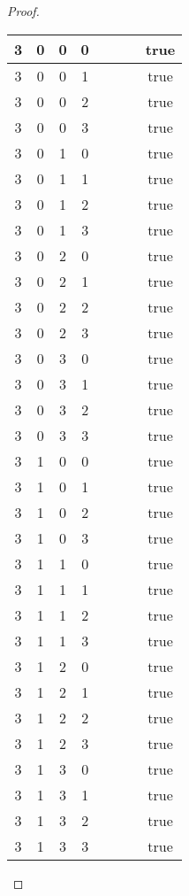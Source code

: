 \documentclass[10pt]{article}
\theoremstyle{definition}
\theoremstyle{plain}
\begin{document}
\begin{proof}
\begin{longtable}{|c|c|c|c|c|c|c|c|}
      3 & 0 & 0 & 0 &  &  &  & true \tabularnewline \hline
      3 & 0 & 0 & 1 &  &  &  & true \tabularnewline \hline
      3 & 0 & 0 & 2 &  &  &  & true \tabularnewline \hline
      3 & 0 & 0 & 3 &  &  &  & true \tabularnewline \hline
      3 & 0 & 1 & 0 &  &  &  & true \tabularnewline \hline
      3 & 0 & 1 & 1 &  &  &  & true \tabularnewline \hline
      3 & 0 & 1 & 2 &  &  &  & true \tabularnewline \hline
      3 & 0 & 1 & 3 &  &  &  & true \tabularnewline \hline
      3 & 0 & 2 & 0 &  &  &  & true \tabularnewline \hline
      3 & 0 & 2 & 1 &  &  &  & true \tabularnewline \hline
      3 & 0 & 2 & 2 &  &  &  & true \tabularnewline \hline
      3 & 0 & 2 & 3 &  &  &  & true \tabularnewline \hline
      3 & 0 & 3 & 0 &  &  &  & true \tabularnewline \hline
      3 & 0 & 3 & 1 &  &  &  & true \tabularnewline \hline
      3 & 0 & 3 & 2 &  &  &  & true \tabularnewline \hline
      3 & 0 & 3 & 3 &  &  &  & true \tabularnewline \hline
      3 & 1 & 0 & 0 &  &  &  & true \tabularnewline \hline
      3 & 1 & 0 & 1 &  &  &  & true \tabularnewline \hline
      3 & 1 & 0 & 2 &  &  &  & true \tabularnewline \hline
      3 & 1 & 0 & 3 &  &  &  & true \tabularnewline \hline
      3 & 1 & 1 & 0 &  &  &  & true \tabularnewline \hline
      3 & 1 & 1 & 1 &  &  &  & true \tabularnewline \hline
      3 & 1 & 1 & 2 &  &  &  & true \tabularnewline \hline
      3 & 1 & 1 & 3 &  &  &  & true \tabularnewline \hline
      3 & 1 & 2 & 0 &  &  &  & true \tabularnewline \hline
      3 & 1 & 2 & 1 &  &  &  & true \tabularnewline \hline
      3 & 1 & 2 & 2 &  &  &  & true \tabularnewline \hline
      3 & 1 & 2 & 3 &  &  &  & true \tabularnewline \hline
      3 & 1 & 3 & 0 &  &  &  & true \tabularnewline \hline
      3 & 1 & 3 & 1 &  &  &  & true \tabularnewline \hline
      3 & 1 & 3 & 2 &  &  &  & true \tabularnewline \hline
      3 & 1 & 3 & 3 &  &  &  & true \tabularnewline \hline


\end{longtable}
\end{proof}
\end{document}
